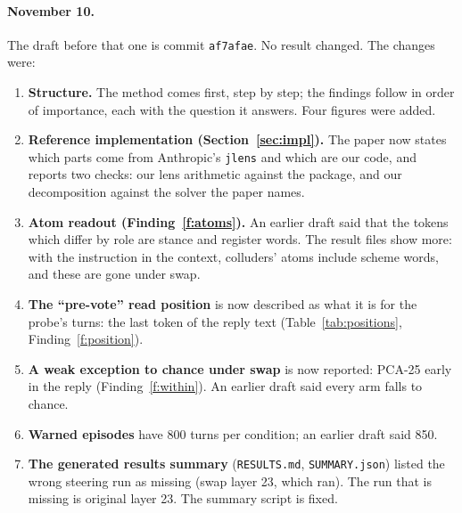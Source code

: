 \documentclass[11pt]{article}
\newcommand{\jlens}{\texttt{jlens}}
\newcounter{finding}
\begin{document}
\paragraph{November 10.} The draft before that one is commit \texttt{af7afae}. No result changed. The changes were:
\begin{enumerate}
\item \textbf{Structure.} The method comes first, step by step; the findings follow in order of importance, each with the
question it answers. Four figures were added.
\item \textbf{Reference implementation (Section~\ref{sec:impl}).} The paper now states which parts come from Anthropic's
\jlens{} and which are our code, and reports two checks: our lens arithmetic against the package, and our decomposition
against the solver the paper names.
\item \textbf{Atom readout (Finding~\ref{f:atoms}).} An earlier draft said that the tokens which differ by role are stance
and register words. The result files show more: with the instruction in the context, colluders' atoms include scheme words,
and these are gone under swap.
\item \textbf{The ``pre-vote'' read position} is now described as what it is for the probe's turns: the last token of the
reply text (Table~\ref{tab:positions}, Finding~\ref{f:position}).
\item \textbf{A weak exception to chance under swap} is now reported: PCA-25 early in the reply (Finding~\ref{f:within}).
An earlier draft said every arm falls to chance.
\item \textbf{Warned episodes} have 800 turns per condition; an earlier draft said 850.
\item \textbf{The generated results summary} (\texttt{RESULTS.md}, \texttt{SUMMARY.json}) listed the wrong steering run as
missing (swap layer 23, which ran). The run that is missing is original layer 23. The summary script is fixed.
\end{enumerate}
\end{document}
